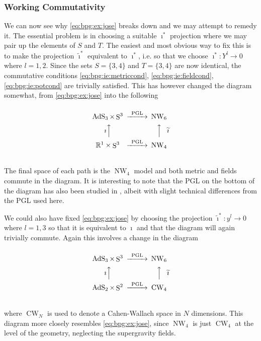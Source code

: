 \documentclass[11pt, a4paper, titlepage]{article}
\DeclareMathOperator{\AdS}{AdS}
\DeclareMathOperator{\Sphere}{S}
\DeclareMathOperator{\NW}{NW}
\DeclareMathOperator{\CW}{CW}
\let\S\Sphere
\begin{document}
\subsubsection{Working Commutativity}
We can now see why \eqref{eq:bpg:ex:jose} breaks down and we may attempt to
remedy it. The essential problem is in choosing a suitable $\imath^*$ projection
where we may pair up the elements of $S$ and $T$. The easiest and most obvious
way to fix this is to make the projection $\widetilde{\imath}^*$ equivalent to
$\imath^*$, i.e. so that we choose $\imath^*: Y^l\rightarrow 0$ where $l=1,2$.
Since the sets $S=\{3,4\}$ and $T=\{3,4\}$ are now identical, the commutative
conditions \eqref{eq:bpg:ie:metriccond}, \eqref{eq:bpg:ie:fieldcond},
\eqref{eq:bpg:ie:potcond} are trivially satisfied. This has however changed the
diagram somewhat, from \eqref{eq:bpg:ex:jose} into the following
\begin{equation}
  \label{eq:bpg:ex:fixed1}
  \begin{CD}
    @.\\
    \AdS_3 \times \S^3             @>\text{PGL}>> \NW_6\\
    \text{$\imath$}@AAA @AAA\text{$\widetilde{\imath}$}\\
    \mathbb{R}^1\times\S^3         @>\text{PGL}>> \NW_4\\
    @.
  \end{CD}
\end{equation}
The final space of each path is the $\NW_4$ model and both metric and fields
commute in the diagram. It is interesting to note that the PGL on the bottom of
the diagram has also been studied in \cite{kiritsis}, albeit with slight
technical differences from the PGL used here.

We could also have fixed \eqref{eq:bpg:ex:jose} by choosing the projection
$\widetilde{\imath}^*: y^l\rightarrow 0$ where $l=1,3$ so that it is equivalent
to $\imath$ and that the diagram will again trivially commute. Again this
involves a change in the diagram
\begin{equation}
  \label{eq:bpg:ex:fixed2}
  \begin{CD}
    @.\\
    \AdS_3 \times \S^3             @>\text{PGL}>> \NW_6\\
    \text{$\imath$}@AAA @AAA\text{$\widetilde{\imath}$}\\
    \AdS_2 \times \S^2             @>\text{PGL}>> \CW_4\\
    @.
  \end{CD}
\end{equation}
where $\CW_N$ is used to denote a Cahen-Wallach space \cite{cw} in $N$
dimensions. This diagram more closely resembles \eqref{eq:bpg:ex:jose}, since
$\NW_4$ is just $\CW_4$ at the level of the geometry, neglecting the
supergravity fields.
\end{document}
